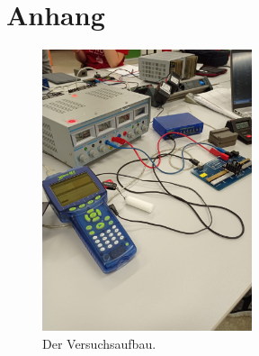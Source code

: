 \newpage
\section{Anhang}

    \begin{figure}[h]
        \centering
        \includegraphics[width=0.55\textwidth]{latex/images/aufbau.jpeg}
        \caption{Der Versuchsaufbau.}
        \label{img:mess1}
      \end{figure}
  